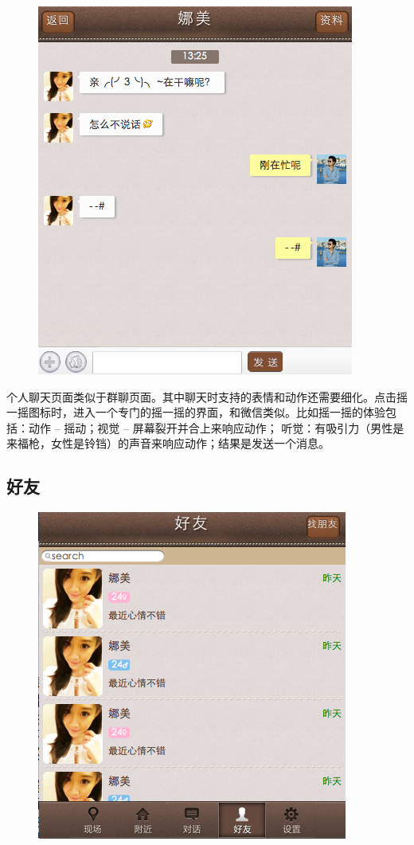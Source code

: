 \documentclass[cs4size]{ctexartutf8}
\begin{document}
\begin{figure}[H]
\centering
\includegraphics[scale=0.5]{./7.png}
\end{figure}

个人聊天页面类似于群聊页面。其中聊天时支持的表情和动作还需要细化。点击摇一摇图标时，进入一个专门的摇一摇的界面，和微信类似。比如摇一摇的体验包括：动作 – 摇动；视觉 – 屏幕裂开并合上来响应动作； 听觉：有吸引力（男性是来福枪，女性是铃铛）的声音来响应动作；结果是发送一个消息。



\subsection{好友}

\begin{figure}[H]
\centering
\includegraphics[scale=0.5]{./8.png}
\end{figure}
\end{document}
